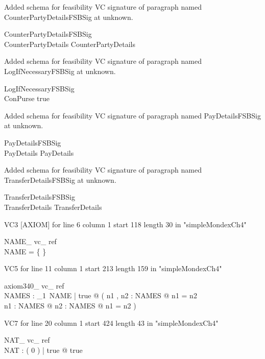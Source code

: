 \documentclass{article}
\begin{document}
Added schema for feasibility VC signature of paragraph named CounterPartyDetailsFSBSig at unknown.
\begin{schema}{CounterPartyDetailsFSBSig}
\\
 CounterPartyDetails 
\where
 CounterPartyDetails
\end{schema}


Added schema for feasibility VC signature of paragraph named LogIfNecessaryFSBSig at unknown.
\begin{schema}{LogIfNecessaryFSBSig}
\\
 ConPurse 
\where
 true
\end{schema}


Added schema for feasibility VC signature of paragraph named PayDetailsFSBSig at unknown.
\begin{schema}{PayDetailsFSBSig}
\\
 PayDetails 
\where
 PayDetails
\end{schema}


Added schema for feasibility VC signature of paragraph named TransferDetailsFSBSig at unknown.
\begin{schema}{TransferDetailsFSBSig}
\\
 TransferDetails 
\where
 TransferDetails
\end{schema}

VC3 [AXIOM] for line 6 column 1 start 118 length 30 in "simpleMondexCh4"
\begin{theorem}{ NAME\_ vc\_ ref}\\
 \lnot NAME = \{ \} \\

\end{theorem}

VC5 for line 11 column 1 start 213 length 159 in "simpleMondexCh4"
\begin{theorem}{ axiom340\_ vc\_ ref}\\
 \exists NAMES : {\finset}_{1}~NAME | true @ ( \exists n1 , n2 : NAMES @ \lnot n1 = n2 \\
 \forall n1 : NAMES @ \exists n2 : NAMES @ \lnot n1 = n2 ) \\

\end{theorem}

VC7 for line 20 column 1 start 424 length 43 in "simpleMondexCh4"
\begin{theorem}{ NAT\_ vc\_ ref}\\
 \exists NAT : \power ( 0  ) | true @ true \\

\end{theorem}
\end{document}
